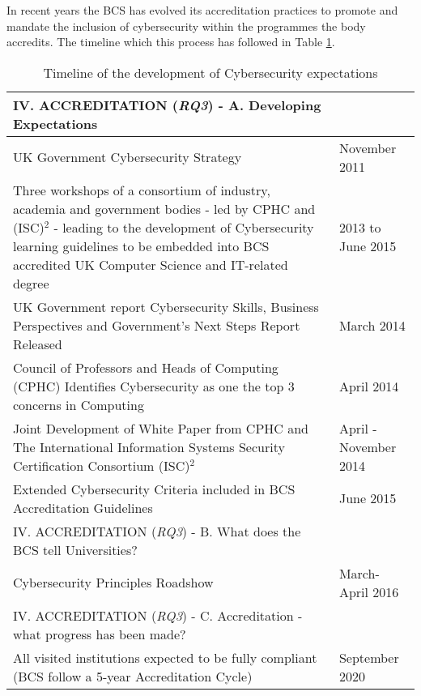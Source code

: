 \documentclass[conference]{IEEEtran}
\begin{document}
In recent years the BCS has evolved its accreditation practices to promote and mandate the inclusion of cybersecurity within the programmes the body accredits. The timeline which this process has followed in Table \ref{table:1}.
  \begin{table}[h!]
  \caption{Timeline of the development of Cybersecurity expectations}
  \label{table:1}
  \begin{tabular}{ | p{6cm} |p{1.5cm} |}
    \hline
    IV. ACCREDITATION ({\emph{RQ3}}) - A. Developing Expectations &   \\ \hline
    UK Government Cybersecurity Strategy \cite{ukcyberstrategy:2016} & November 2011 \\ \hline
    Three workshops of a consortium of industry, academia and government bodies - led by CPHC and  (ISC)$^2$ - leading to the development of Cybersecurity learning guidelines to be embedded into BCS accredited UK Computer Science and IT-related degree \cite{CPHCISC2}  & 2013 to June 2015 \\ \hline
    UK Government report Cybersecurity Skills, Business Perspectives and Government's Next Steps Report Released \cite{UKCabinetOffice2014} & March 2014  \\ \hline
    Council of Professors and Heads of Computing (CPHC) Identifies Cybersecurity as one the top 3 concerns in Computing & April 2014 \\ \hline
    Joint Development of White Paper from CPHC and The International Information Systems Security Certification Consortium (ISC)$^2$ \cite{CPHCISC2014} & April -November 2014 \\ \hline
    Extended Cybersecurity Criteria included in BCS Accreditation Guidelines \cite{BCS2018a}& June 2015 \\
    \hline
    IV. ACCREDITATION ({\emph{RQ3}}) - B. What does the BCS tell Universities? & \\ \hline
    Cybersecurity Principles Roadshow & March-April 2016 \\ \hline
    IV. ACCREDITATION ({\emph{RQ3}}) - C. Accreditation - what progress has been made? &  \\ \hline
    All visited institutions expected to be fully compliant 
 (BCS follow a 5-year Accreditation Cycle)  & September 2020\\ \hline
  \end{tabular}
  \end{table}
\end{document}
